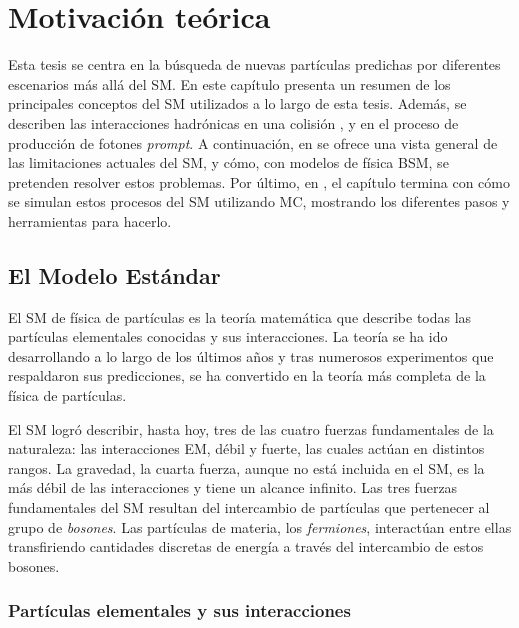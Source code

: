 \chapter{Motivaci\'on te\'orica}
\label{ch:theory}


Esta tesis se centra en la búsqueda de nuevas partículas predichas por diferentes escenarios más allá del \ac{SM}. En este capítulo presenta un resumen de los principales conceptos del \ac{SM} utilizados a lo largo de esta tesis. Adem\'as, se describen las interacciones hadrónicas en una colisión \pp, y en el proceso de producción de fotones \textit{prompt}.
A continuación, en \Sect{\ref{sec:theory:bsm}} se ofrece una vista general de las limitaciones actuales del \ac{SM}, y c\'omo, con modelos de f\'isica \ac{BSM}, se pretenden resolver estos problemas.
Por último, en \Sect{\ref{sec:theory:mc_simulation}}, el capítulo termina con cómo se simulan estos procesos del \ac{SM} utilizando \ac{MC}, mostrando los diferentes pasos y herramientas para hacerlo.




\section{El Modelo Est\'andar}
\label{sec:theory:sm}

El \acf{SM} de física de partículas es la teoría matemática que describe todas las partículas elementales conocidas y sus interacciones.
La teoría se ha ido desarrollando a lo largo de los últimos años y tras numerosos experimentos que respaldaron sus predicciones, se ha convertido en la teoría más completa de la física de partículas.

El \ac{SM} logró describir, hasta hoy, tres de las cuatro fuerzas fundamentales de la naturaleza: las interacciones \ac{EM}, débil y fuerte, las cuales act\'uan en distintos rangos.
La gravedad, la cuarta fuerza, aunque no está incluida en el \ac{SM}, es la más débil de las interacciones y tiene un alcance infinito.
Las tres fuerzas fundamentales del \ac{SM} resultan del intercambio de part\'iculas que pertenecer al grupo de \textit{bosones}. Las part\'iculas de materia, los \textit{fermiones}, interact\'uan entre ellas transfiriendo cantidades discretas de energ\'ia a trav\'es del intercambio de estos bosones.



\subsection{Part\'iculas elementales y sus interacciones}
\label{subsec:theory:sm:particles_interaction}

